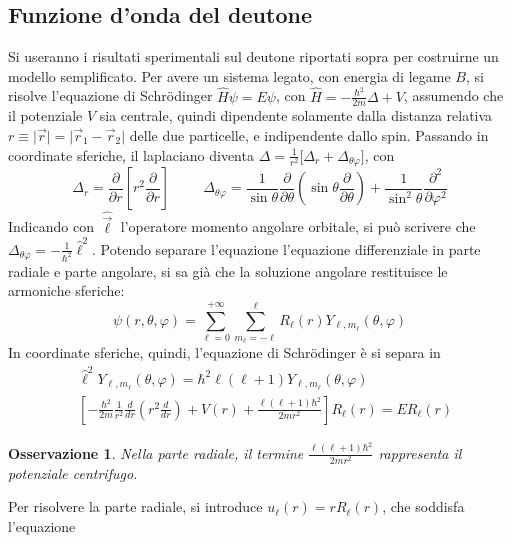 \documentclass[11pt, a4paper]{scrartcl}
\theoremstyle{style}
\newtheorem{osservazione}{Osservazione}[section]
\numberwithin{equation}{subsection}
\begin{document}
\subsection{Funzione d'onda del deutone}
Si useranno i risultati sperimentali sul deutone riportati sopra per costruirne un modello semplificato.
Per avere un sistema legato, con energia di legame $B$, si risolve l'equazione di Schr\"odinger $\hat{H}\psi = E \psi $, con $\hat{H} = - \frac{\hbar ^2}{2m} \Delta + V$, assumendo che il potenziale $V$ sia centrale, quindi dipendente solamente dalla distanza relativa $r \equiv \lvert \vec{r} \rvert  = \lvert \vec{r}_1 - \vec{r}_2 \rvert $ delle due particelle, e indipendente dallo spin.
Passando in coordinate sferiche, il laplaciano diventa $\Delta = \frac{1}{r^2} \big[\Delta _r + \Delta _{\theta  \varphi }\big]$, con 
\[
\Delta _r = \frac{\partial }{\partial r} \left[ r^2 \frac{\partial }{\partial r}  \right]  \hspace{1cm} \Delta _{\theta \varphi } = \frac{1}{\sin \theta }\frac{\partial }{\partial \theta }  \left(\sin \theta  \frac{\partial }{\partial \theta } \right)  + \frac{1}{\sin^2 \theta } \frac{\partial ^2 }{\partial \varphi ^2} 
\] 
Indicando con $\hat{\vec{\ell }}$ l'operatore momento angolare orbitale, si pu\`o scrivere che $\Delta _{\theta \varphi } = - \frac{1}{\hbar ^2} \hat{\ell }^2$.
Potendo separare l'equazione l'equazione differenziale in parte radiale e parte angolare, si sa gi\`a che la soluzione angolare restituisce le armoniche sferiche:
\begin{equation}
	\psi (r,\theta ,\varphi ) = \sum_{\ell =0}^{+\infty} \sum_{m_\ell = - \ell }^{\ell } R_\ell (r) Y_{\ell ,m_\ell }(\theta ,\varphi )
\end{equation}
In coordinate sferiche, quindi, l'equazione di Schr\"odinger \`e si separa in
\begin{align}
	&\hat{\ell }^2 Y_{\ell ,m_\ell }(\theta ,\varphi ) = \hbar ^2 \ell (\ell +1) Y_{\ell ,m_\ell }(\theta ,\varphi ) \tag{parte angolare}\\
	&\left[ - \frac{\hbar ^2}{2m}\frac{1}{r^2}\frac{d }{d r} \left(r^2 \frac{d }{d r} \right) + V(r) + \frac{\ell (\ell +1) \hbar ^2}{2mr^2} \right] R_\ell (r) = ER_\ell (r) \tag{parte radiale}
\end{align}
\begin{osservazione}
Nella parte radiale, il termine $\frac{\ell (\ell +1) \hbar ^2}{2mr^2}$ rappresenta il potenziale centrifugo.
\end{osservazione}
\noindent Per risolvere la parte radiale, si introduce $u_\ell (r) = r R_\ell (r)$, che soddisfa l'equazione 
\end{document}
